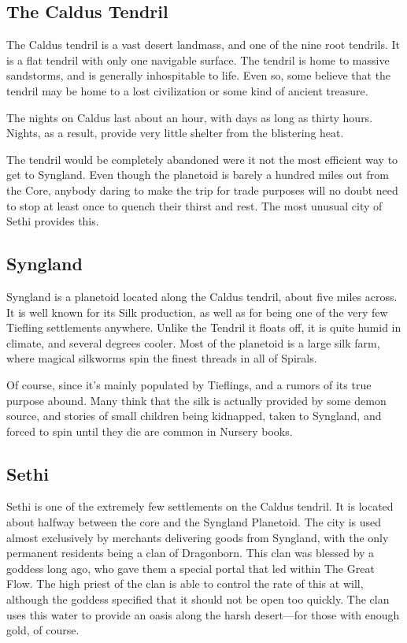 \begin{multicols}{2}
\section{The Caldus Tendril}
The Caldus tendril is a vast desert landmass, and one of the nine root tendrils.
It is a flat tendril with only one navigable surface.
The tendril is home to massive sandstorms, and is generally inhospitable to life.
Even so, some believe that the tendril may be home to a lost civilization or some kind of ancient treasure.

The nights on Caldus last about an hour, with days as long as thirty hours.
Nights, as a result, provide very little shelter from the blistering heat.

The tendril would be completely abandoned were it not the most efficient way to get to Syngland.
Even though the planetoid is barely a hundred miles out from the Core, anybody daring to make the trip for trade purposes will no doubt need to stop at least once to quench their thirst and rest.
The most unusual city of Sethi provides this.

\subsection{Syngland}
Syngland is a planetoid located along the Caldus tendril, about five miles across.
It is well known for its Silk production, as well as for being one of the very few Tiefling settlements anywhere.
Unlike the Tendril it floats off, it is quite humid in climate, and several degrees cooler.
Most of the planetoid is a large silk farm, where magical silkworms spin the finest threads in all of Spirals.

Of course, since it's mainly populated by Tieflings, and a rumors of its true purpose abound.
Many think that the silk is actually provided by some demon source, and stories of small children being kidnapped, taken to Syngland, and forced to spin until they die are common in Nursery books.

\subsection{Sethi}
Sethi is one of the extremely few settlements on the Caldus tendril.
It is located about halfway between the core and the Syngland Planetoid.
The city is used almost exclusively by merchants delivering goods from Syngland, with the only permanent residents being a clan of Dragonborn.
This clan was blessed by a goddess long ago, who gave them a special portal that led within The Great Flow.
The high priest of the clan is able to control the rate of this at will, although the goddess specified that it should not be open too quickly.
The clan uses this water to provide an oasis along the harsh desert---for those with enough gold, of course. 



\end{multicols}
